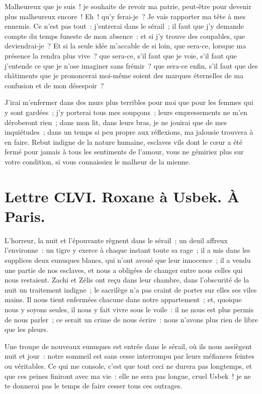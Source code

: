 \documentclass[french,twoside]{book} %
\newcommand{\dateline}[1]{\medskip{\RaggedLeft{#1}\par}\bigskip}
\begin{document}
Malheureux que je suis ! je souhaite de revoir ma patrie, peut-être pour devenir plus malheureux encore ! Eh ! qu’y ferai-je ? Je vais rapporter ma tête à mes ennemis. Ce n’est pas tout : j’entrerai dans le sérail ; il faut que j’y demande compte du temps funeste de mon absence : et si j’y trouve des coupables, que deviendrai-je ? Et si la seule idée m’accable de si loin, que sera-ce, lorsque ma présence la rendra plus vive ? que sera-ce, s’il faut que je voie, s’il faut que j’entende ce que je n’ose imaginer sans frémir ? que sera-ce enfin, s’il faut que des châtiments que je prononcerai moi-même soient des marques éternelles de ma confusion et de mon désespoir ?\par
J’irai m’enfermer dans des murs plus terribles pour moi que pour les femmes qui y sont gardées ; j’y porterai tous mes soupçons ; leurs empressements ne m’en déroberont rien ; dans mon lit, dans leurs bras, je ne jouirai que de mes inquiétudes ; dans un temps si peu propre aux réflexions, ma jalousie trouvera à en faire. Rebut indigne de la nature humaine, esclaves vils dont le cœur a été fermé pour jamais à tous les sentiments de l’amour, vous ne gémiriez plus sur votre condition, si vous connaissiez le malheur de la mienne.\par

\dateline{De Paris, le 4 de la lune de Chahban, 1719.}
\section[{Lettre CLVI. Roxane à Usbek. À Paris.}]{Lettre CLVI. Roxane à Usbek. À Paris.}\renewcommand{\leftmark}{Lettre CLVI. Roxane à Usbek. À Paris.}

\noindent L’horreur, la nuit et l’épouvante règnent dans le sérail ; un deuil affreux l’environne : un tigre y exerce à chaque instant toute sa rage ; il a mis dans les supplices deux eunuques blancs, qui n’ont avoué que leur innocence ; il a vendu une partie de nos esclaves, et nous a obligées de changer entre nous celles qui nous restaient. Zachi et Zélis ont reçu dans leur chambre, dans l’obscurité de la nuit un traitement indigne ; le sacrilège n’a pas craint de porter sur elles ses viles mains. Il nous tient enfermées chacune dans notre appartement ; et, quoique nous y soyons seules, il nous y fait vivre sous le voile : il ne nous est plus permis de nous parler ; ce serait un crime de nous écrire : nous n’avons plus rien de libre que les pleurs.\par
Une troupe de nouveaux eunuques est entrée dans le sérail, où ils nous assiègent nuit et jour : notre sommeil est sans cesse interrompu par leurs méfiances feintes ou véritables. Ce qui me console, c’est que tout ceci ne durera pas longtemps, et que ces peines finiront avec ma vie : elle ne sera pas longue, cruel Usbek ! je ne te donnerai pas le temps de faire cesser tous ces outrages.\par
\end{document}
